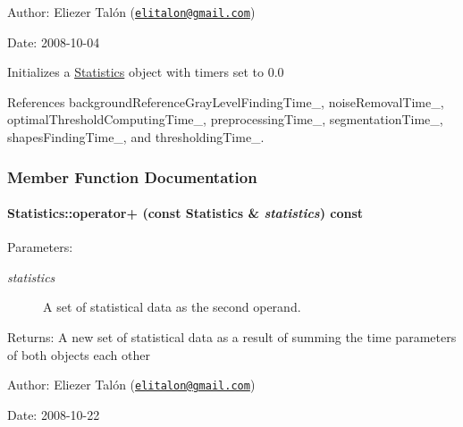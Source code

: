 \begin{Desc}
\item[Author:]Eliezer Talón (\href{mailto:elitalon@gmail.com}{\tt elitalon@gmail.com}) \end{Desc}
\begin{Desc}
\item[Date:]2008-10-04\end{Desc}
Initializes a \hyperlink{class_statistics}{Statistics} object with timers set to 0.0 

References backgroundReferenceGrayLevelFindingTime\_\-, noiseRemovalTime\_\-, optimalThresholdComputingTime\_\-, preprocessingTime\_\-, segmentationTime\_\-, shapesFindingTime\_\-, and thresholdingTime\_\-.

\subsubsection{Member Function Documentation}
\hypertarget{class_statistics_cb07c98a63e07fdb1476ffb282b84676}{
\paragraph[operator+]{ Statistics::operator+ (const {\bf Statistics} \& {\em statistics}) const}\hfill}
\label{class_statistics_cb07c98a63e07fdb1476ffb282b84676}


\begin{Desc}
\item[Parameters:]
\begin{description}
\item[{\em statistics}]A set of statistical data as the second operand.\end{description}
\end{Desc}
\begin{Desc}
\item[Returns:]A new set of statistical data as a result of summing the time parameters of both objects each other\end{Desc}
\begin{Desc}
\item[Author:]Eliezer Talón (\href{mailto:elitalon@gmail.com}{\tt elitalon@gmail.com}) \end{Desc}
\begin{Desc}
\item[Date:]2008-10-22 \end{Desc}



